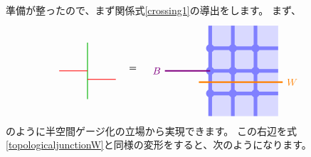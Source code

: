 \documentclass[report,paper=a4, fontsize=12pt, line_length=16cm, number_of_lines=33,dvipdfmx]{jlreq}
\numberwithin{equation}{chapter}
\begin{document}
準備が整ったので、まず関係式\eqref{crossing1}の導出をします。
まず、
\begin{align}
  \begin{tikzpicture}[baseline=0]
      \draw[darkgreen,thick] (0,1)--(0,-1);
      \draw[red,thick] (-1,0)--(0,0);
      \draw[red,thick] (1,-0.3)--(0,-0.3);
  \end{tikzpicture}
  \quad
  &=\quad
  \begin{tikzpicture}[baseline=0cm,scale=0.8]
      \foreach \x in {0,1,2}{
          \foreach \y in {-2,-1,...,1}{
          \fill[plaqblue](\x,\y) rectangle (\x+1,\y+1);
          }
      }
      \foreach \x in {0,1,2}{
          \foreach \y in {-1,0,1}{
              \fill[linkblue] (\x,\y) circle (1.8mm);
          }
      }
      \foreach \x in {0,1,2}{
          \foreach \y in {-1,0,1}{
              \draw[linkblue, line width = 1.3mm](\x,\y)--(\x + 1,\y);
          }
      }
      \foreach \x in {0,1,2}{
          \foreach \y in {-2,-1,...,1}{
              \draw[linkblue, line width = 1.3mm](\x,\y)--(\x,\y + 1);
          }
      }
      \draw[red!50!yellow, ultra thick](-0.5,-0.5)--(3.2,-0.5) node[right]{$W$};
      \draw[red!50!blue, ultra thick](0,0)--(-2,0) node[left]{$B$};
  \end{tikzpicture}
\end{align}
のように半空間ゲージ化の立場から実現できます。
この右辺を式\eqref{topologicaljunctionW}と同様の変形をすると、次のようになります。
\end{document}
